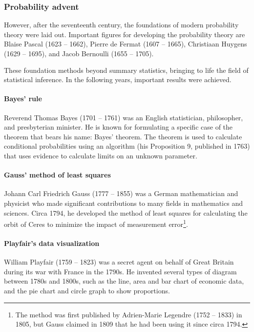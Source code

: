 \subsubsection{Probability advent}

However, after the seventeenth century, the foundations of modern probability theory were
laid out.  Important figures for developing the probability theory are Blaise Pascal (1623
-- 1662), Pierre de Fermat (1607 -- 1665), Christiaan Huygens (1629 -- 1695), and Jacob
Bernoulli (1655 -- 1705).

These foundation methods beyond summary statistics, bringing to life the field of
statistical inference. In the following years, important results were achieved.

\paragraph{Bayes' rule}

Reverend Thomas Bayes (1701 -- 1761) was an English statistician, philosopher, and
presbyterian minister.  He is known for formulating a specific case of the theorem that
bears his name: Bayes' theorem.  The theorem is used to calculate conditional
probabilities using an algorithm (his Proposition 9, published in 1763) that uses evidence to calculate
limits on an unknown parameter.

\paragraph{Gauss' method of least squares}

Johann Carl Friedrich Gauss (1777 -- 1855) was a German mathematician and physicist who made
significant contributions to many fields in mathematics and sciences.  Circa 1794, he
developed the method of least squares for calculating the orbit of Ceres to minimize the
impact of measurement error\footnote{The method was first published by Adrien-Marie
Legendre (1752 -- 1833) in 1805, but Gauss claimed in 1809 that he
had been using it since circa 1794.}.

\paragraph{Playfair's data visualization}

William Playfair (1759 -- 1823) was a secret agent on behalf of Great Britain during its
war with France in the 1790s.  He invented several types of diagram between 1780s and
1800s, such as the line, area and bar chart of economic data, and the pie chart and circle
graph to show proportions.

